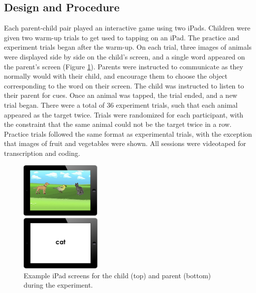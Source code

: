 \documentclass[10pt, letterpaper]{article}
\newenvironment{CodeChunk}{}{}
\begin{document}
\hypertarget{design-and-procedure}{%
\subsection{Design and Procedure}\label{design-and-procedure}}

Each parent-child pair played an interactive game using two iPads.
Children were given two warm-up trials to get used to tapping on an
iPad. The practice and experiment trials began after the warm-up. On
each trial, three images of animals were displayed side by side on the
child's screen, and a single word appeared on the parent's screen
(Figure \ref{fig:ipads}). Parents were instructed to communicate as they
normally would with their child, and encourage them to choose the object
corresponding to the word on their screen. The child was instructed to
listen to their parent for cues. Once an animal was tapped, the trial
ended, and a new trial began. There were a total of 36 experiment
trials, such that each animal appeared as the target twice. Trials were
randomized for each participant, with the constraint that the same
animal could not be the target twice in a row. Practice trials followed
the same format as experimental trials, with the exception that images
of fruit and vegetables were shown. All sessions were videotaped for
transcription and coding.

\begin{CodeChunk}
\begin{figure}[tb]

{\centering \includegraphics[width=150px]{figs/ipads} 

}

\caption[Example iPad screens for the child (top) and parent (bottom) during the experiment]{Example iPad screens for the child (top) and parent (bottom) during the experiment.}\label{fig:ipads}
\end{figure}
\end{CodeChunk}
\end{document}
